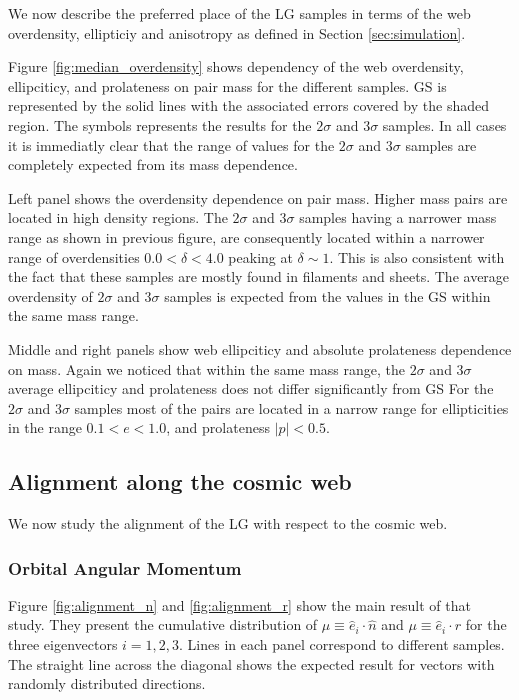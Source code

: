 \documentclass{emulateapj}
\begin{document}
We now describe the preferred place of the LG samples in terms of the
web overdensity, ellipticiy and anisotropy as defined in Section
\ref{sec:simulation}. 

Figure \ref{fig:median_overdensity} shows dependency of the web overdensity,
ellipciticy, and prolateness on pair mass for the different samples.
GS is represented by the solid lines with the associated 
errors covered by the shaded region. 
The symbols represents the results for the $2\sigma$ and $3\sigma$
samples.  
In all cases it is immediatly clear that the range of values for the
$2\sigma$ and $3\sigma$ samples are completely expected from its mass
dependence.  

Left panel shows the overdensity dependence on pair mass. 
Higher mass pairs are located in high density regions.
The $2\sigma$ and $3\sigma$ samples having a narrower mass range as 
shown in previous figure, are consequently located within a narrower 
range of overdensities $0.0<\delta<4.0$ peaking at $\delta \sim 1$. 
This is also consistent with the fact that these samples are mostly 
found in filaments and sheets. 
The average overdensity of $2\sigma$ and $3\sigma$ samples is expected
from the values in the GS within the same mass range.

Middle and right panels show web ellipciticy and absolute prolateness
dependence on mass. Again we noticed that within the same mass range,
the $2\sigma$ and $3\sigma$ average ellipciticy and prolateness does not
differ significantly from GS
For the $2\sigma$ and $3\sigma$ samples most of the pairs are located
in a narrow range for ellipticities in the range $0.1<e<1.0$, and
prolateness $|p|<0.5$.


\subsection{Alignment along the cosmic web}

We now study the alignment of the LG with respect to the cosmic web.

\subsubsection{Orbital Angular Momentum}

Figure \ref{fig:alignment_n} and \ref{fig:alignment_r} show  the main result of that study.
They present the cumulative distribution of
$\mu\equiv\hat{e}_i\cdot\hat{n}$ and $\mu\equiv\hat{e}_i\cdot\hat{r}$
for the three eigenvectors $i=1,2,3$.   
Lines in each panel correspond to different samples.
The straight line across the diagonal shows the expected
result for vectors with randomly distributed directions.
\end{document}
